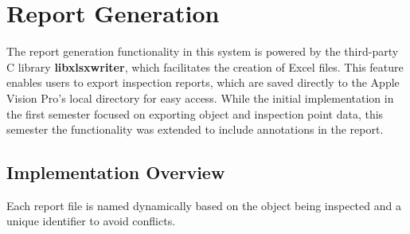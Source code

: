 
\section{Report Generation}

The report generation functionality in this system is powered by the third-party C library \textbf{libxlsxwriter}, which facilitates the creation of Excel files. This feature enables users to export inspection reports, which are saved directly to the Apple Vision Pro's local directory for easy access. While the initial implementation in the first semester focused on exporting object and inspection point data, this semester the functionality was extended to include annotations in the report.

\subsection{Implementation Overview}
Each report file is named dynamically based on the object being inspected and a unique identifier to avoid conflicts.

